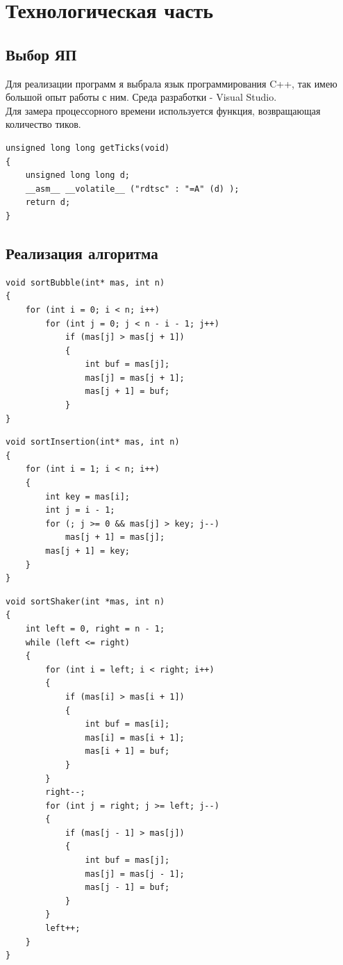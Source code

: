 \documentclass[12pt]{report}
\begin{document}
\chapter{Технологическая часть}
\section{Выбор ЯП}
Для реализации программ я выбрала язык программирования C++, так имею большой опыт работы с ним. Среда разработки - Visual Studio. \\

Для замера процессорного времени используется функция, возвращающая количество тиков.\\

\begin{lstlisting}[label=some-code,caption=Функция получения тиков]
unsigned long long getTicks(void)
{
    unsigned long long d;
    __asm__ __volatile__ ("rdtsc" : "=A" (d) );
    return d;
}

\end{lstlisting}

\section{Реализация алгоритма}

\begin{lstlisting}[label=some-code,caption=Алгоритм сортировки пузырьком]
void sortBubble(int* mas, int n) 
{ 
	for (int i = 0; i < n; i++)         
		for (int j = 0; j < n - i - 1; j++)             
			if (mas[j] > mas[j + 1])
			{
				int buf = mas[j];
				mas[j] = mas[j + 1];
				mas[j + 1] = buf;
			}
}
\end{lstlisting}


\begin{lstlisting}[label=some-code,caption=Алгоритм сортировки вставками]
void sortInsertion(int* mas, int n) 
{ 
	for (int i = 1; i < n; i++) 
	{ 
		int key = mas[i];         
		int j = i - 1;         
		for (; j >= 0 && mas[j] > key; j--)             
			mas[j + 1] = mas[j];         
		mas[j + 1] = key; 
	} 
}
\end{lstlisting}


\begin{lstlisting}[label=some-code,caption=Алгоритм шейкерной сортировки]
void sortShaker(int *mas, int n)
{
	int left = 0, right = n - 1;
	while (left <= right)
	{
		for (int i = left; i < right; i++)
		{
			if (mas[i] > mas[i + 1])
			{
				int buf = mas[i];
				mas[i] = mas[i + 1];
				mas[i + 1] = buf;
			}
		}
		right--;
		for (int j = right; j >= left; j--)
		{
			if (mas[j - 1] > mas[j])
			{
				int buf = mas[j];
				mas[j] = mas[j - 1];
				mas[j - 1] = buf;
			}
		}
		left++;
	}
}
\end{lstlisting}
\end{document}
